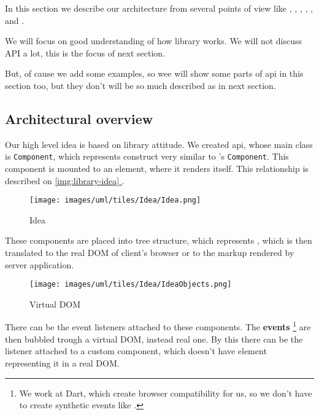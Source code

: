 \documentclass[oneside, 12pt]{book}
\newcommand*{\fullref}[1]{\hyperref[{#1}]{\autoref*{#1} \nameref*{#1}}}
\begin{document}
  In this section we describe our architecture from several points of view like 
	, 
  , 
  , 
  , 
  , 
   and
  .

  We will focus on good understanding of how library works. 
  We will not discuss API a lot, this is the focus of next section. 

  But, of cause we add some examples, so wee will show some parts of api in this section too, 
  but they don't will be so much described as in next section.

  \subsection{Architectural overview}\label{subsec:our-architecture-overview}
	Our high level idea is based on \facebook \react library attitude. 
    We created api, whose main class is \texttt{Component}, which represents construct very similar to \react's \texttt{Component}.
    This component is mounted to an element, where it renders itself. 
    This relationship is described on \fullref{img:library-idea}.
    \begin{figure}[h]
    \centering  
      \texttt{[image: images/uml/tiles/Idea/Idea.png]}
      \caption{Idea}
      \label{img:library-idea}
    \end{figure}

    These components are placed into tree structure, which represents \mbox{\textbf{}}, 
    which is then translated to the real DOM of client's browser or to the markup rendered by server application.

    \begin{figure}[h]
    \centering  
      \texttt{[image: images/uml/tiles/Idea/IdeaObjects.png]}
      \caption{Virtual DOM}
      \label{img:library-idea-virtual-dom}
    \end{figure}
    There can be the event listeners attached to these components. 
    The \textbf{events} \footnote{We work at Dart, which create browser compatibility for us, so we don't have to create synthetic events like \react.}
    are then bubbled trough a virtual DOM, instead real one.
    By this there can be the listener attached to a custom component, which doesn't have element representing it in a real DOM.
\end{document}
